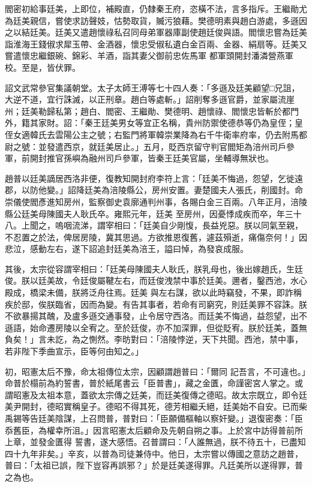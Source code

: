 \begin{pinyinscope}
 閻密初給事廷美，上即位，補殿直，仍隸秦王府，恣橫不法，言多指斥。王繼勛尤為廷美親信，嘗使求訪聲妓，怙勢取貨，贓污狼藉。樊德明素與趙白游處，多遜因之以結廷美。廷美又遣趙懷祿私召同母弟軍器庫副使趙廷俊與語。閻懷忠嘗為廷美詣淮海王錢俶求犀玉帶、金酒器，懷忠受俶私遺白金百兩、金器、絹扇等。廷美又嘗遣懷忠繼銀碗、錦彩、羊酒，詣其妻父御前忠佐馬軍
 都軍頭開封潘潾營燕軍校。至是，皆伏罪。



 詔文武常參官集議朝堂。太子太師王溥等七十四人奏：「多遜及廷美顧望□兄詛，大逆不道，宜行誅滅，以正刑章。趙白等處斬。」詔削奪多遜官爵，並家屬流崖州；廷美勒歸私第；趙白、閻密、王繼勛、樊德明、趙懷祿、閻懷忠皆斬於都門外，籍其家財。詔：「秦王廷美男女等宜正名稱，貴州防禦使德恭等仍為皇侄；皇侄女適韓氏去雲陽公主之號；右監門將軍韓崇業降為右千牛衛率府率，仍去附馬都
 尉之號：並發遣西京，就廷美居止。」五月，貶西京留守判官閻矩為涪州司戶參軍，前開封推官孫嶼為融州司戶參軍，皆秦王廷美官屬，坐輔導無狀也。



 趙普以廷美謫居西洛非便，復教知開封府李符上言：「廷美不悔過，怨望，乞徙遠郡，以防他變。」詔降廷美為涪陵縣公，房州安置。妻楚國夫人張氏，削國封。命崇儀使閻彥進知房州，監察御史袁廓通判州事，各賜白金三百兩。八年正月，涪陵縣公廷美母陳國夫人耿氏卒。雍熙元年，廷美
 至房州，因憂悸成疾而卒，年三十八。上聞之，嗚咽流涕，謂宰相曰：「廷美自少剛愎，長益兇惡。朕以同氣至親，不忍置之於法，俾居房陵，冀其思過。方欲推恩復舊，遽茲殞逝，痛傷奈何！」因悲泣，感動左右，遂下詔追封廷美為涪王，謚曰悼，為發哀成服。



 其後，太宗從容謂宰相曰：「廷美母陳國夫人耿氏，朕乳母也，後出嫁趙氏，生廷俊。朕以廷美故，令廷俊屬鞬左右，而廷俊洩禁中事於廷美。邇者，鑿西池，水心殿成，橋梁未備，朕將泛舟往焉。廷美
 與左右謀，欲以此時竊發，不果，即詐稱疾於邸，俟朕臨省，因而為變。有告其事者，若命有司窮究，則廷美罪不容誅。朕不欲暴揚其醜，及盧多遜交通事發，止令居守西洛。而廷美不悔過，益怨望，出不遜語，始命遷房陵以全宥之。至於廷俊，亦不加深罪，但從貶宥。朕於廷美，蓋無負矣！」言未訖，為之惻然。李昉對曰：「涪陵悖逆，天下共聞。西池，禁中事，若非陛下季曲宣示，臣等何由知之。」



 初，昭憲太后不豫，命太祖傳位太宗，因顧謂趙普曰：「爾同
 記吾言，不可違也。」命普於榻前為約誓書，普於紙尾書云「臣普書」，藏之金匱，命謹密宮人掌之。或謂昭憲及太祖本意，蓋欲太宗傳之廷美，而廷美復傳之德昭。故太宗既立，即令廷美尹開封，德昭實稱皇子。德昭不得其死，德芳相繼夭絕，廷美始不自安。已而柴禹錫等告廷美陰謀，上召問普，普對曰：「臣願備樞軸以察奸變。」退復密奏：「臣忝舊臣，為權幸所沮。」因言昭憲太后顧命及先朝自朔之事。上於宮中訪得普前所上章，並發金匱得
 誓書，遂大感悟。召普謂曰：「人誰無過，朕不待五十，已盡知四十九年非矣。」辛亥，以普為司徒兼侍中。他日，太宗嘗以傳國之意訪之趙普，普曰：「太祖已誤，陛下豈容再誤邪？」於是廷美遂得罪。凡廷美所以遂得罪，普之為也。




\end{pinyinscope}
